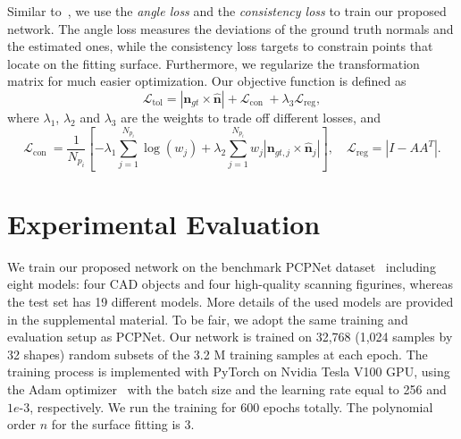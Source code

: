 \documentclass[runningheads]{llncs}
\begin{document}
 Similar to~\cite{ben2020deepfit}, we use the \emph{angle loss} and the \emph{consistency loss} to train our proposed network. The angle loss measures the deviations of the ground truth normals and the estimated ones, while the consistency loss targets to constrain points that locate on the fitting surface. Furthermore, we regularize the transformation matrix for much easier optimization. Our objective function is defined as 
\begin{equation}
\mathcal{L}_{\text{tol}}=\left|\mathbf{n}_{gt} \times  \hat{\mathbf{n}}\right|+\mathcal{L}_{\text {con }}+\lambda_{3} \mathcal{L}_{\text {reg}},
\end{equation}
where $\lambda_{1}$, $\lambda_{2}$ and $\lambda_{3}$ are the weights to trade off different losses, and 
\begin{equation}
\mathcal{L}_{\text {con }}=\frac{1}{N_{p_{i}}}\left[-\lambda_{1} \sum_{j=1}^{N_{p_{i}}} \log \left(w_{j}\right)+\lambda_{2} \sum_{j=1}^{N_{p_{i}}} w_{j}\left|\mathbf{n}_{gt, j} \times \hat{\mathbf{n}}_{j}\right|\right], \quad \mathcal{L}_{\text{reg}}=\left|I-A A^{T}\right|.
\end{equation}



\section{Experimental Evaluation}\label{sec:exp}
 We train our proposed network on the benchmark PCPNet dataset~\cite{guerrero2018pcpnet} including eight models: four CAD objects and four high-quality scanning figurines, whereas the test set has 19 different models. More details of the used models are provided in the supplemental material. To be fair, we adopt the same training and evaluation setup as PCPNet. Our network is trained on 32,768 (1,024 samples by 32 shapes) random subsets of the 3.2 M training samples at each epoch. The training process is implemented with PyTorch on Nvidia Tesla V100 GPU, using the Adam optimizer~\cite{kingma2014adam} with the batch size and the learning rate equal to 256 and $1e\mbox{-}3$, respectively. We run the training for 600 epochs totally. The polynomial order $n$ for the surface fitting is 3. 
\end{document}
